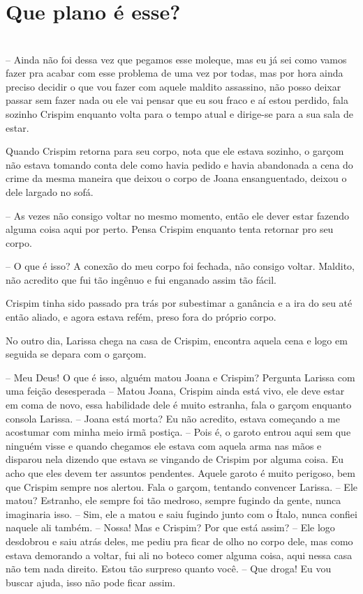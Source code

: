 
\newpage


\ifdefined\useChapters
\chapter{Que plano é esse?}

\else
\chapter{}
\fi
-- Ainda não foi dessa vez que pegamos esse moleque, mas eu já sei como vamos fazer pra acabar com esse problema de uma vez por todas, mas por hora ainda preciso decidir o que vou fazer com aquele maldito assassino, não posso deixar passar sem fazer nada ou ele vai pensar que eu sou fraco e aí estou perdido, fala sozinho Crispim enquanto volta para o tempo atual e dirige-se para a sua sala de estar.

Quando Crispim retorna para seu corpo, nota que ele estava sozinho, o garçom não estava tomando conta dele como havia pedido e havia abandonada a cena do crime da mesma maneira que deixou o corpo de Joana ensanguentado, deixou o dele largado no sofá. 

-- As vezes não consigo voltar no mesmo momento, então ele dever estar fazendo alguma coisa aqui por perto. Pensa Crispim enquanto tenta retornar pro seu corpo.

-- O que é isso? A conexão do meu corpo foi fechada, não consigo voltar. Maldito, não acredito que fui tão ingênuo e fui enganado assim tão fácil.

Crispim tinha sido passado pra trás por subestimar a ganância e a ira do seu até então aliado, e agora estava refém, preso fora do próprio corpo.

No outro dia, Larissa chega na casa de Crispim, encontra aquela cena e logo em seguida se depara com o garçom.

-- Meu Deus! O que é isso, alguém matou Joana e Crispim? Pergunta Larissa com uma feição desesperada
-- Matou Joana, Crispim ainda está vivo, ele deve estar em coma de novo, essa habilidade dele é muito estranha, fala o garçom enquanto consola Larissa.
-- Joana está morta? Eu não acredito, estava começando a me acostumar com minha meio irmã postiça.
-- Pois é, o garoto entrou aqui sem que ninguém visse e quando chegamos ele estava com aquela arma nas mãos e disparou nela dizendo que estava se vingando de Crispim por alguma coisa. Eu acho que eles devem ter assuntos pendentes. Aquele garoto é muito perigoso, bem que Crispim sempre nos alertou. Fala o garçom, tentando convencer Larissa.
-- Ele matou? Estranho, ele sempre foi tão medroso, sempre fugindo da gente, nunca imaginaria isso.
-- Sim, ele a matou e saiu fugindo junto com o Ítalo, nunca confiei naquele ali também.
-- Nossa! Mas e Crispim? Por que está assim?
-- Ele logo desdobrou e saiu atrás deles, me pediu pra ficar de olho no corpo dele, mas como estava demorando a voltar, fui ali no boteco comer alguma coisa, aqui nessa casa não tem nada direito. Estou tão surpreso quanto você.
-- Que droga! Eu vou buscar ajuda, isso não pode ficar assim.

